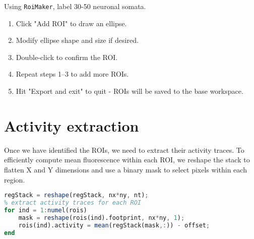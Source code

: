 \documentclass[a4paper]{report}
\newcommand{\nexercise}[0]{\arabic{exercises}\addtocounter{exercises}{1}}
\begin{document}
\begin{exercisebox}[frametitle={Exercise \nexercise: Defining ROIs}]
Using \texttt{RoiMaker}, label 30-50 neuronal somata.
\begin{enumerate}
\item Click "Add ROI" to draw an ellipse.
\item Modify ellipse shape and size if desired.
\item Double-click to confirm the ROI.
\item Repeat steps 1--3 to add more ROIs.
\item Hit "Export and exit" to quit - ROIs will be saved to the base workspace.
\end{enumerate}
\end{exercisebox}

\section{Activity extraction}
Once we have identified the ROIs, we need to extract their activity traces. 
To efficiently compute mean fluorescence within each ROI, we reshape the stack to flatten X and Y dimensions and use a binary mask to select pixels within each region.
\begin{lstlisting}[language=Octave]
% reshape the stack for easy indexing
regStack = reshape(regStack, nx*ny, nt);
% extract activity traces for each ROI
for ind = 1:numel(rois)
    mask = reshape(rois(ind).footprint, nx*ny, 1);
    rois(ind).activity = mean(regStack(mask,:)) - offset;
end
\end{lstlisting}
\end{document}
